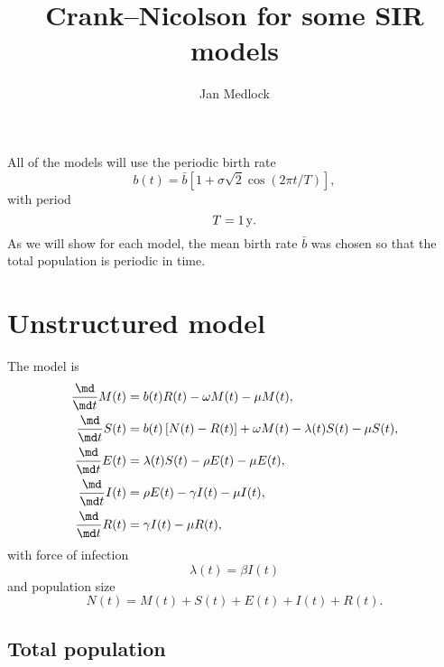 \documentclass{jpmarticle}
\title{Crank--Nicolson for some SIR models}
\author{Jan Medlock}
\begin{document}
\maketitle


All of the models will use the periodic birth rate
\begin{equation}
  b(t) = \bar{b} \left[
    1 + \sigma \sqrt{2} \cos\left(2 \pi t / T\right)
  \right],
\end{equation}
with period
\begin{equation}
  T = \unit[1]{y}.
\end{equation}
As we will show for each model, the mean birth rate $\bar{b}$
was chosen so that the total population is periodic in time.


\section{Unstructured model}

The model is
\begin{equation}
  \label{model_unstructured}
  \begin{split}
    \frac{\md}{\md t} M(t) &=
    b(t) R(t) - \omega M(t) - \mu M(t),
    \\
    \frac{\md}{\md t} S(t) &=
    b(t) \left[N(t) - R(t)\right] + \omega M(t) - \lambda(t) S(t) - \mu S(t),
    \\
    \frac{\md}{\md t} E(t) &=
    \lambda(t) S(t) - \rho E(t) - \mu E(t),
    \\
    \frac{\md}{\md t} I(t) &=
    \rho E(t) - \gamma I(t) - \mu I(t),
    \\
    \frac{\md}{\md t} R(t) &=
    \gamma I(t) - \mu R(t),
  \end{split}
\end{equation}
with force of infection
\begin{equation}
  \lambda(t) = \beta I(t)
\end{equation}
and population size
\begin{equation}
  N(t) = M(t) + S(t) + E(t) + I(t) + R(t).
\end{equation}


\subsection{Total population}
\end{document}

